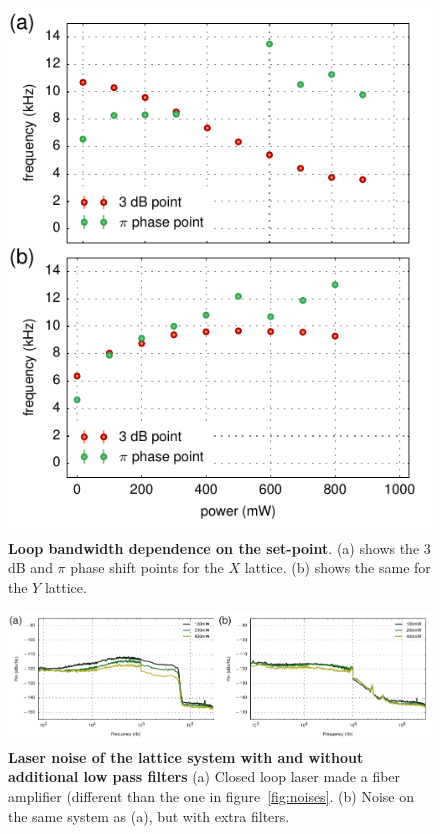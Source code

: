 \documentclass[twocolumn,aps,pra,showpacs,preprintnumbers,bibnotes]{revtex4-1}
\begin{document}
\begin{figure}
  \begin{center}
    \includegraphics{fig/low_power_bandwidths.pdf}
    \caption{\textbf{Loop bandwidth dependence on the set-point}. (a) shows the $3$ dB and $\pi$ phase shift points for the $X$ lattice. (b) shows the same for the $Y$ lattice.}\label{fig:bandwidth}
  \end{center}
\end{figure}

\begin{figure}
  \begin{center}
    \includegraphics{fig/low_pass_filters.pdf}
    \caption{\textbf{Laser noise of the lattice system with and without additional low pass filters} (a) Closed loop laser made a fiber amplifier (different than the one in figure~\ref{fig:noises}. (b) Noise on the same system as (a), but with extra filters.}\label{fig:low_pass_noises}
  \end{center}
\end{figure}
\end{document}
